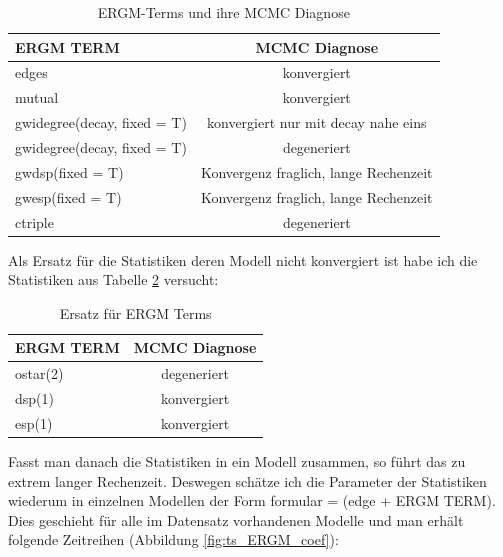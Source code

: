 \documentclass[a4paper,ngerman,oneside,titlepage,bibliography=totoc,11pt]{scrreprt}
\begin{document}
\begin{table}[h]
	\centering
		\begin{tabular}{l|c}
		\hline 
		ERGM TERM 									& MCMC Diagnose\\
		\hline
		edges 											& konvergiert\\
		mutual 											& konvergiert\\
		gwidegree(decay, fixed = T)	& konvergiert nur mit decay nahe eins\\
		gwidegree(decay, fixed = T)	& degeneriert\\
		gwdsp(fixed = T)						& Konvergenz fraglich, lange Rechenzeit\\
		gwesp(fixed = T)						& Konvergenz fraglich, lange Rechenzeit\\
		ctriple 										& degeneriert\\
		\hline
		\end{tabular}
	\caption{ERGM-Terms und ihre MCMC Diagnose}
	\label{tab:ergmrobins}
\end{table}

Als Ersatz für die Statistiken deren Modell nicht konvergiert ist  habe ich die Statistiken aus Tabelle \ref{tab:ergmrobinsersatz} versucht:

\begin{table}[h]
	\centering
		\begin{tabular}{l|c}
		\hline 
		ERGM TERM 									& MCMC Diagnose\\
		\hline
		ostar(2)										& degeneriert\\
		dsp(1)											& konvergiert\\
		esp(1)											& konvergiert\\
			\hline
		\end{tabular}
	\caption{Ersatz für ERGM Terms}
	\label{tab:ergmrobinsersatz}
\end{table}
 
Fasst man danach die Statistiken in ein Modell zusammen, so führt das zu extrem langer Rechenzeit. Deswegen schätze ich die Parameter der Statistiken wiederum in einzelnen Modellen der Form formular = (edge + ERGM TERM). Dies geschieht für alle im Datensatz vorhandenen Modelle und man erhält folgende Zeitreihen (Abbildung \ref{fig:ts_ERGM_coef}):
\end{document}
